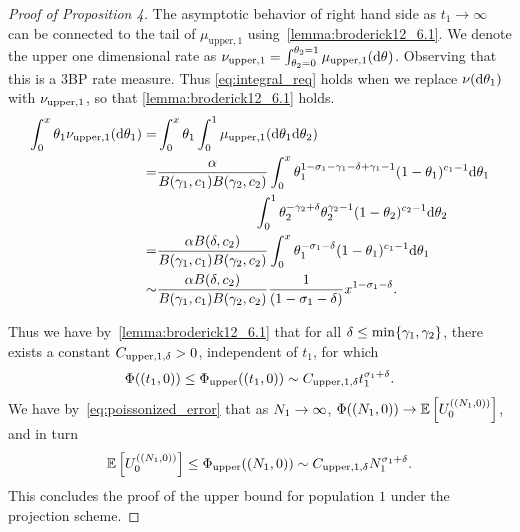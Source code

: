 \begin{proof}[Proof of Proposition 4]
The asymptotic behavior of right hand side as $t_1\to\infty$ can be connected to the tail of $\mu_{\mathrm{upper}, 1}$ using~\cref{lemma:broderick12_6.1}. We denote the upper one dimensional rate as $\levync_{\mathrm{upper}, 1}=\int_{\variantfreqperpop{2}=0}^{\variantfreqperpop{2}=1} \mu_{\mathrm{upper}, 1}(\de\vecvariantfreq{})$. Observing that this is a 3BP rate measure. Thus \cref{eq:integral_req} holds when we replace $\nu(\mathrm{d} \theta_{1})$ with $\nu_{\mathrm{upper}, 1}$, so that \cref{lemma:broderick12_6.1} holds. 
\begin{align*}
   \int_{0}^{x}\theta_{1} \nu_{\mathrm{upper}, 1}(\mathrm{d}\theta_{1}) = &\int_{0}^{x} \theta_{1} \int_{0}^1 \mu_{\mathrm{upper}, 1}(\mathrm{d}\theta_{1}\mathrm{d} \theta_{2})  \\
    =&\frac{\alpha}{B(\gamma_{1}, c_{1})B(\gamma_{2}, c_{2})}\int_{0}^x \theta_{1}^{1-\sigma_{1}-\gamma_{1}-\delta+\gamma_{1}-1} (1-\theta_{1})^{c_{1}-1}\mathrm{d}\theta_{1} \\
    & \quad\qquad\qquad\qquad \int_0^1 \theta_{2}^{-\gamma_{2}+\delta}\theta_{2}^{\gamma_{2}-1}(1-\theta_{2})^{c_{2}-1} \mathrm{d}\theta_{2}\\
    =&\frac{\alpha B(\delta, c_{2})}{B(\gamma_{1}, c_{1})B(\gamma_{2}, c_{2})}\int_{0}^x \theta_{1}^{-\sigma_{1}-\delta} (1-\theta_{1})^{c_{1}-1}\mathrm{d}\theta_{1} \\
    \sim& \frac{\alpha B(\delta, c_{2})}{B(\gamma_{1}, c_{1})B(\gamma_{2}, c_{2})} \frac{1}{(1-\sigma_{1}-\delta)} x^{1-\sigma_{1}-\delta}.
\end{align*}


Thus we have by~\cref{lemma:broderick12_6.1} that for all $\delta\le \min\{\gamma_{1}, \gamma_{2}\}$, there exists a constant $C_{\mathrm{upper},1,\delta}>0$, independent of $t_1$, for which
\begin{align*}
    \Phi((t_1,0))\le \Phi_{\mathrm{upper}}((t_1,0))\sim C_{\mathrm{upper},1,\delta} t_1^{\sigma_{1}+\delta}.
\end{align*}
We have by~\cref{eq:poissonized_error} that as $N_{1}\to \infty$, $\poissonize((\samplesize{1},0)) \to \E\left[\news{\zerovec}{(\samplesize{1},0)} \right]$, and in turn
\begin{equation}
    \E\left[\news{\zerovec}{(\samplesize{1},0)} \right] \le \upperbound((\samplesize{1},0))\sim \constantupper{1} \samplesize{1}^{\rate{1}+\smallpositive}.
    \label{eq:upperbound_pop1}
\end{equation}
This concludes the proof of the upper bound for population $1$ under the projection scheme.


\end{proof}
